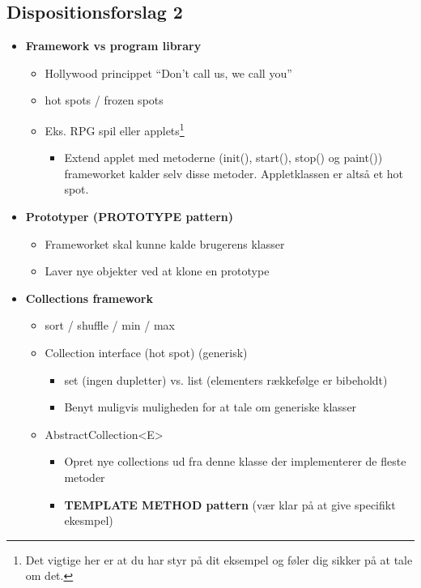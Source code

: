 \subsection{Dispositionsforslag 2}

\begin{itemize}
    \item \textbf{Framework vs program library}
    \begin{itemize}
        \item Hollywood princippet “Don’t call us, we call you”
        \item hot spots / frozen spots
        \item Eks. RPG spil eller applets\footnote{Det vigtige her er at du har styr på dit eksempel og føler dig sikker på at tale om det.}
        \begin{itemize}
            \item Extend applet med metoderne (init(), start(), stop() og paint()) frameworket kalder selv disse metoder. Appletklassen er altså et hot spot.
        \end{itemize}
    \end{itemize}
    
    \item \textbf{Prototyper (PROTOTYPE pattern)}
    \begin{itemize}
        \item Frameworket skal kunne kalde brugerens klasser
        \item Laver nye objekter ved at klone en prototype
    \end{itemize}
    
    \item \textbf{Collections framework}
    \begin{itemize}
        \item sort / shuffle / min / max
        \item Collection interface (hot spot) (generisk)
        \begin{itemize}
            \item set (ingen dupletter) vs. list (elementers rækkefølge er bibeholdt)
            \item Benyt muligvis muligheden for at tale om generiske klasser
        \end{itemize}

        \item AbstractCollection\textless E\textgreater
        \begin{itemize}
            \item Opret nye collections ud fra denne klasse der implementerer de fleste metoder
            \item \textbf{TEMPLATE METHOD pattern} (vær klar på at give specifikt ekesmpel)
        \end{itemize}
    \end{itemize}
\end{itemize}













